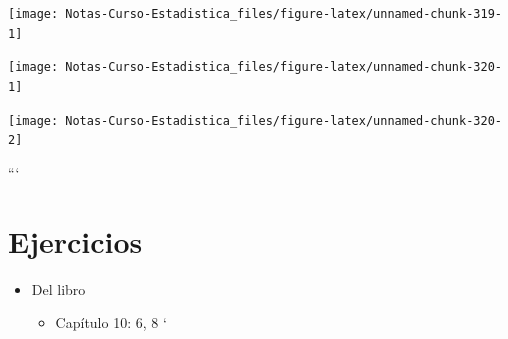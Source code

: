\documentclass[
  12pt,
]{book}
\newenvironment{Shaded}{\begin{snugshade}}{\end{snugshade}}
\newcommand{\DecValTok}[1]{\textcolor[rgb]{0.00,0.00,0.81}{#1}}
\newcommand{\KeywordTok}[1]{\textcolor[rgb]{0.13,0.29,0.53}{\textbf{#1}}}
\newcommand{\NormalTok}[1]{#1}
\newcommand{\OperatorTok}[1]{\textcolor[rgb]{0.81,0.36,0.00}{\textbf{#1}}}
\providecommand{\tightlist}{%
  \setlength{\itemsep}{0pt}\setlength{\parskip}{0pt}}
\theoremstyle{definition}
\theoremstyle{definition}
\theoremstyle{definition}
\theoremstyle{remark}
\begin{document}
\begin{center}\texttt{[image: Notas-Curso-Estadistica\_files/figure-latex/unnamed-chunk-319-1]} \end{center}

\begin{Shaded}
\end{Shaded}

\begin{center}\texttt{[image: Notas-Curso-Estadistica\_files/figure-latex/unnamed-chunk-320-1]} \end{center}

\begin{Shaded}
\end{Shaded}

\begin{center}\texttt{[image: Notas-Curso-Estadistica\_files/figure-latex/unnamed-chunk-320-2]} \end{center}

```

\hypertarget{ejercicios-6}{%
\section{Ejercicios}\label{ejercicios-6}}

\begin{itemize}
\tightlist
\item
  Del libro \autocite{James2013b}

  \begin{itemize}
  \tightlist
  \item
    Capítulo 10: 6, 8
    `
  \end{itemize}
\end{itemize}

\printbibliography
\end{document}
